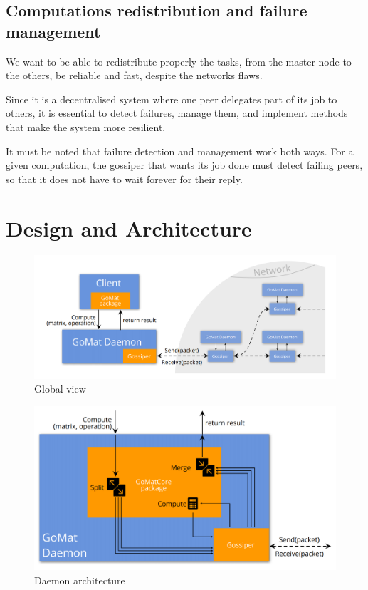 \documentclass[a4paper,12pt]{article}
\begin{document}
        \subsection{Computations redistribution and failure management}
    We want to be able to redistribute properly the tasks, from the master node to the others, be reliable and fast, despite the networks flaws.        
        
    Since it is a decentralised system where one peer delegates part of its job to others, it is essential to detect failures, manage them, and implement methods that make the system more resilient.

    It must be noted that failure detection and management work both ways. For a given computation, the gossiper that wants its job done must detect failing peers, so that it does not have to wait forever for their reply.

    \section{Design and Architecture}
    \begin{figure}[!ht]
        \includegraphics[width=.95\textwidth]{global_view.png}
        \caption{Global view}
        \label{glbView}
    \end{figure}
    \begin{figure}[!ht]
        \includegraphics[width=.95\textwidth]{daemon_view.PNG}
        \caption{Daemon architecture}
        \label{daemonView}
    \end{figure}
\end{document}
